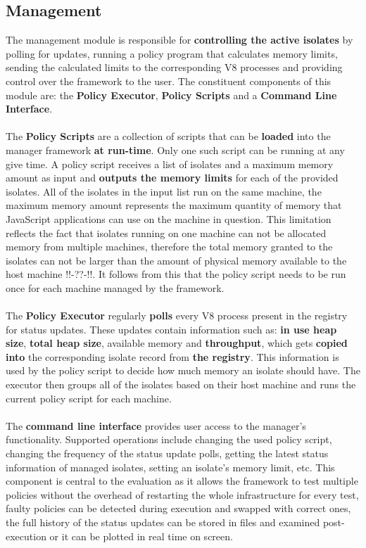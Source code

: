 \documentclass{l4proj}
\begin{document}
\subsection{Management}
\hspace*{3em} The management module is responsible for \textbf{controlling the active isolates} by polling for updates, running a policy program that calculates memory limits, sending the calculated limits to the corresponding V8 processes and providing control over the framework to the user. The constituent components of this module are: the \textbf{Policy Executor}, \textbf{Policy Scripts} and a \textbf{Command Line Interface}.
\\\\
\hspace*{3em} The \textbf{Policy Scripts} are a collection of scripts that can be \textbf{loaded} into the manager framework \textbf{at run-time}. Only one such script can be running at any give time. A policy script receives a list of isolates and a maximum memory amount as input and \textbf{outputs the memory limits} for each of the provided isolates. All of the isolates in the input list run on the same machine, the maximum memory amount represents the maximum quantity of memory that JavaScript applications can use on the machine in question. This limitation reflects the fact that isolates running on one machine can not be allocated memory from multiple machines, therefore the total memory granted to the isolates can not be larger than the amount of physical memory available to the host machine !!-??-!!. It follows from this that the policy script needs to be run once for each machine managed by the framework. 
\\\\
\hspace*{3em} The \textbf{Policy Executor} regularly \textbf{polls} every V8 process present in the registry for status updates. These updates contain information such as: \textbf{in use heap size}, \textbf{total heap size}, available memory and \textbf{throughput}, which gets \textbf{copied into} the corresponding isolate record from  \textbf{the registry}. This information is used by the policy script to decide how much memory an isolate should have. The executor then groups all of the isolates based on their host machine and runs the current policy script for each machine.
\\\\
\hspace*{3em} The \textbf{command line interface} provides user access to the manager's functionality. Supported operations include changing the used policy script, changing the frequency of the status update polls, getting the latest status information of managed isolates, setting an isolate's memory limit, etc. This component is central to the evaluation as it allows the framework to test multiple policies without the overhead of restarting the whole infrastructure for every test, faulty policies can be detected during execution and swapped with correct ones, the full history of the status updates can be stored in files and examined post-execution or it can be plotted in real time on screen.
\end{document}
